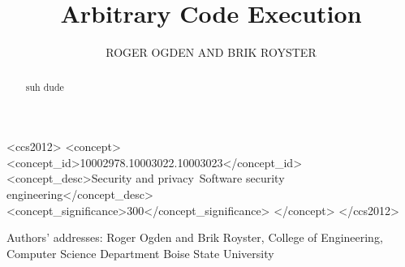 \documentclass{acmsmall}
\begin{document}

\title{Arbitrary Code Execution}
\author{ROGER OGDEN AND BRIK ROYSTER}

\begin{abstract}
suh dude
\end{abstract}

%
%
\begin{CCSXML}
<ccs2012>
<concept>
<concept_id>10002978.10003022.10003023</concept_id>
<concept_desc>Security and privacy~Software security engineering</concept_desc>
<concept_significance>300</concept_significance>
</concept>
</ccs2012>
\end{CCSXML}


%
%




\begin{bottomstuff}
Authors' addresses: Roger Ogden and Brik Royster,
College of Engineering, Computer Science Department
Boise State University
\end{bottomstuff}

\maketitle











\nocite{*}

% 
\end{document}
